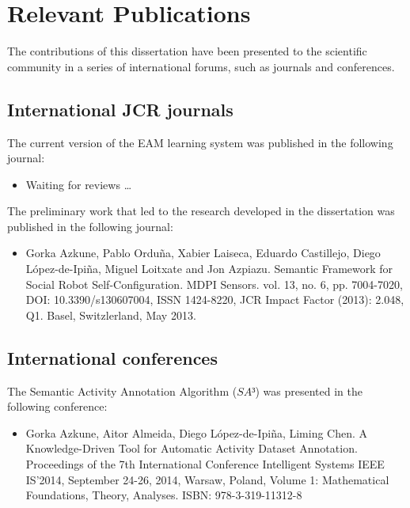 \section{Relevant Publications}
\label{sec:conclusions:pub}

The contributions of this dissertation have been presented to the scientific community in a series of international forums, such as journals and conferences.

\subsection{International JCR journals}

The current version of the EAM learning system was published in the following journal:

\begin{itemize}
 \item Waiting for reviews \ldots
\end{itemize}

The preliminary work that led to the research developed in the dissertation was published in the following journal:

\begin{itemize}
 \item Gorka Azkune, Pablo Orduña, Xabier Laiseca, Eduardo Castillejo, Diego López-de-Ipiña, Miguel Loitxate and Jon Azpiazu. Semantic Framework for Social Robot Self-Configuration. MDPI Sensors. vol. 13, no. 6, pp. 7004-7020, DOI: 10.3390/s130607004, ISSN 1424-8220, JCR Impact Factor (2013): 2.048, Q1. Basel, Switzlerland, May 2013.
\end{itemize}

\subsection{International conferences}

The Semantic Activity Annotation Algorithm ($SA³$) was presented in the following conference:

\begin{itemize}
 \item Gorka Azkune, Aitor Almeida, Diego López-de-Ipiña, Liming Chen. A Knowledge-Driven Tool for Automatic Activity Dataset Annotation. Proceedings of the 7th International Conference Intelligent Systems IEEE IS’2014, September 24-26, 2014, Warsaw, Poland, Volume 1: Mathematical Foundations, Theory, Analyses. ISBN: 978-3-319-11312-8
\end{itemize}

